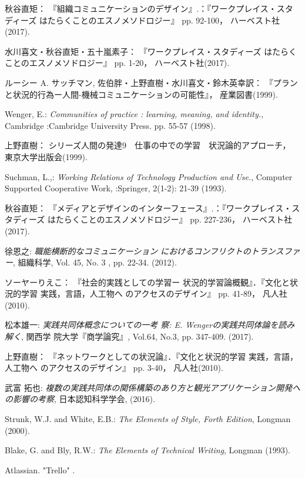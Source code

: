 \documentclass[submit,techrep]{ipsj}
\begin{document}
\begin{thebibliography}{9}

  秋谷直矩：
  『組織コミュニケーションのデザイン』.：『ワークプレイス・スタディーズ はたらくことのエスノメソドロジー』 pp. 92-100，
  ハーベスト社(2017).

  水川喜文・秋谷直矩・五十嵐素子：
  『ワークプレイス・スタディーズ はたらくことのエスノメソドロジー』 pp. 1-20，
  ハーベスト社(2017).

ルーシー A. サッチマン, 佐伯胖・上野直樹・水川喜文・鈴木英幸訳：
『プランと状況的行為ー人間-機械コミュニケーションの可能性』，
産業図書(1999).

Wenger, E.: {\it Communities of practice : learning,
meaning, and identity.},
Cambridge :Cambridge University
Press. pp. 55-57 (1998).

上野直樹：
シリーズ人間の発達9　仕事の中での学習　状況論的アプローチ，
東京大学出版会(1999).

Suchman, L.,: {\it Working Relations of Technology Production and Use.},
Computer Supported Cooperative Work, :Springer,
2(1-2): 21-39 (1993).

  秋谷直矩：
  『メディアとデザインのインターフェース』.：『ワークプレイス・スタディーズ はたらくことのエスノメソドロジー』 pp. 227-236，
  ハーベスト社(2017).

  徐恩之: {\it 職能横断的なコミュニケーション
  におけるコンフリクトのトランスファー},
  組織科学,
  Vol. 45, No. 3 , pp. 22-34. (2012).

  ソーヤーりえこ：
  『社会的実践としての学習ー 状況的学習論概観』．『文化と状況的学習 実践，言語，人工物へ のアクセスのデザイン』 pp. 41-89，
  凡人社(2010).

  松本雄一: {\it 実践共同体概念についての一考 察: E. Wengerの実践共同体論を読み解く},
  関西学 院大学『商学論究』,
  Vol.64, No.3, pp. 347-409. (2017).

上野直樹：
『ネットワークとしての状況論』．『文化と状況的学習 実践，言語，人工物へ のアクセスのデザイン』 pp. 3-40，
凡人社(2010).

武富 拓也: {\it 複数の実践共同体の関係構築のあり方と観光アプリケーション開発への影響の考察},
日本認知科学学会,
(2016).

Strunk, W.J. and White, E.B.: {\it The Elements of Style, Forth Edition},
Longman (2000).

Blake, G. and Bly, R.W.: {\it The Elements of Technical Writing},
Longman (1993).

Atlassian.
"Trello"
%
.


\end{thebibliography}
\end{document}
